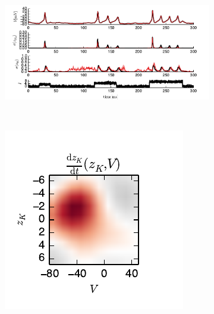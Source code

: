\documentclass[aos]{imsart} %
\begin{document}
\begin{figure}[t!]
  \centering%
  \vspace{-0.5em}
  \begin{subfigure}[T]{6.5in}
    \includegraphics[width=\textwidth]{figure1}
  \end{subfigure}
  \\
  \begin{subfigure}[T]{2in}
      \includegraphics[width=\textwidth]{dk_dt}
  \end{subfigure}

\vspace{-.5em}
\caption{}
\label{fig:figure1}
\vspace{-1.25em}
\end{figure}
\end{document}

